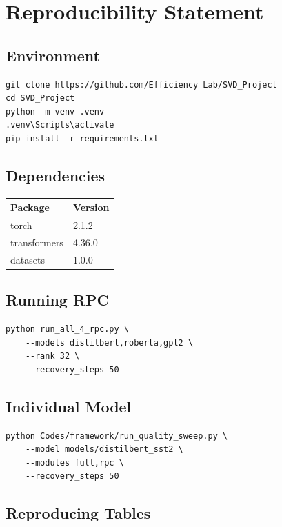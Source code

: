 
\section{Reproducibility Statement}

\subsection{Environment}

\begin{lstlisting}
git clone https://github.com/Efficiency Lab/SVD_Project
cd SVD_Project
python -m venv .venv
.venv\Scripts\activate
pip install -r requirements.txt
\end{lstlisting}

\subsection{Dependencies}

\begin{table}[H]
\centering
\small
\begin{tabular}{ll}
\toprule
\textbf{Package} & \textbf{Version} \\
\midrule
torch & 2.1.2 \\
transformers & 4.36.0 \\
datasets & 1.0.0 \\
\bottomrule
\end{tabular}
\end{table}

\subsection{Running RPC}

\begin{lstlisting}
python run_all_4_rpc.py \
    --models distilbert,roberta,gpt2 \
    --rank 32 \
    --recovery_steps 50
\end{lstlisting}

\subsection{Individual Model}

\begin{lstlisting}
python Codes/framework/run_quality_sweep.py \
    --model models/distilbert_sst2 \
    --modules full,rpc \
    --recovery_steps 50
\end{lstlisting}

\subsection{Reproducing Tables}

